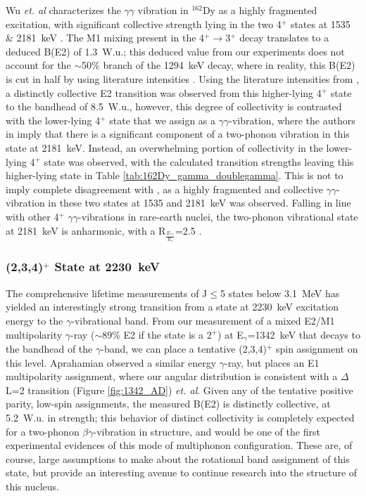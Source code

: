 Wu \textit{et. al} characterizes the $\gamma\gamma$ vibration in $^{162}$Dy as a highly fragmented excitation, with significant collective strength lying in the two 4$^+$ states at 1535 \& 2181~keV \cite{Wu_2minus_2001}. The M1 mixing present in the 4$^+\rightarrow$3$^+$ decay translates to a deduced B(E2) of 1.3~W.u.; this deduced value from our experiments does not account for the $\sim$50\% branch of the 1294~keV decay, where in reality, this B(E2) is cut in half by using literature intensities \cite{BERZINS1995413,Wu_2minus_2001}. Using the literature intensities from \cite{Wu_2minus_2001}, a distinctly collective E2 transition was observed from this higher-lying 4$^+$ state to the bandhead of 8.5~W.u., however, this degree of collectivity is contrasted with the lower-lying 4$^+$ state that we assign as a $\gamma\gamma$-vibration, where the authors in \cite{Wu_2minus_2001} imply that there is a significant component of a two-phonon vibration in this state at 2181~keV. Instead, an overwhelming portion of collectivity in the lower-lying 4$^+$ state was observed, with the calculated transition strengths leaving this higher-lying state in Table \ref{tab:162Dy_gamma_doublegamma}. This is not to imply complete disagreement with \cite{Wu_2minus_2001}, as a highly fragmented and collective $\gamma\gamma$-vibration in these two states at 1535 and 2181~keV was observed. Falling in line with other 4$^+$ $\gamma\gamma$-vibrations in rare-earth nuclei, the two-phonon vibrational state at 2181~keV is anharmonic, with a R$_{\frac{E_{\gamma\gamma}}{E_\gamma}}$=2.5 \cite{Garrett_twogammaEr_1997}.
\subsubsection{(2,3,4)$^+$ State at 2230~keV}
The comprehensive lifetime measurements of J$\leq$5 states below 3.1~MeV has yielded an interestingly strong transition from a state at 2230~keV excitation energy to the $\gamma$-vibrational band. From our measurement of a mixed E2/M1 multipolarity $\gamma$-ray ($\sim$89\% E2 if the state is a 2$^+$) at E$_\gamma$=1342~keV that decays to the bandhead of the $\gamma$-band, we can place a tentative (2,3,4)$^+$ spin assignment on this level. Aprahamian observed a similar energy $\gamma$-ray, but places an E1 multipolarity assignment, where our angular distribution is consistent with a $\Delta$L=2 transition (Figure \ref{fig:1342_AD}) \cite{Aprahamian200642} \textit{et. al}. Given any of the tentative positive parity, low-spin assignments, the measured B(E2) is distinctly collective, at 5.2~W.u. in strength; this behavior of distinct collectivity is completely expected for a two-phonon $\beta\gamma$-vibration in structure, and would be one of the first experimental evidences of this mode of multiphonon configuration. These are, of course, large assumptions to make about the rotational band assignment of this state, but provide an interesting avenue to continue research into the structure of this nucleus.


